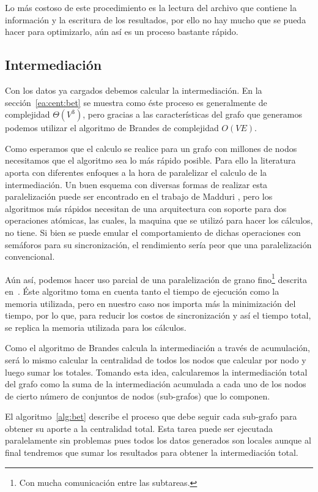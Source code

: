 

Lo más costoso de este procedimiento es la lectura del archivo que contiene la
información y la escritura de los resultados, por ello no hay mucho que se pueda
hacer para optimizarlo, aún así es un proceso bastante rápido.

\subsection{Intermediación}
Con los datos ya cargados debemos calcular la intermediación. En la
sección~\ref{ea:cent:bet} se muestra como éste proceso es generalmente de
complejidad $\Theta (V^3)$, pero gracias a las
características del grafo que generamos podemos utilizar el algoritmo de
Brandes\cite{brandes2001faster} de complejidad $O(VE)$.

Como esperamos que el calculo se realice para un grafo con millones de nodos
necesitamos que el algoritmo sea lo más rápido posible. Para ello la literatura
aporta con diferentes enfoques a la hora de paralelizar el calculo de la
intermediación. Un buen esquema con diversas formas de realizar esta
paralelización puede ser encontrado en el trabajo de Madduri
\etal\cite{madduri2009faster}, pero los algoritmos más rápidos necesitan de una
arquitectura con soporte para dos operaciones atómicas, las cuales, la maquina
que se utilizó para hacer los cálculos, no tiene. Si bien se puede emular el
comportamiento de dichas operaciones con semáforos para su sincronización, el
rendimiento sería peor que una paralelización convencional.

Aún así, podemos hacer uso parcial de una paralelización de grano
fino\footnote{Con mucha comunicación entre las subtareas.} descrita
en~\cite{bader2006parallel}. Éste algoritmo toma en cuenta tanto el tiempo de
ejecución como la memoria utilizada, pero en nuestro caso nos importa más la
minimización del tiempo, por lo que, para reducir los costos de sincronización y
así el tiempo total, se replica la memoria utilizada para los cálculos.

Como el algoritmo de Brandes calcula la intermediación a través de acumulación,
será lo mismo calcular la centralidad de todos los nodos que calcular por nodo y
luego sumar los totales. Tomando esta idea, calcularemos la intermediación total
del grafo como la suma de la intermediación acumulada a cada uno de los nodos de
cierto número de conjuntos de nodos (sub-grafos) que lo componen.

El algoritmo~\ref{alg:bet} describe el proceso que debe seguir cada sub-grafo
para obtener su aporte a la centralidad total. Esta tarea puede ser ejecutada
paralelamente sin problemas pues todos los datos generados son locales aunque
al final tendremos que sumar los resultados para obtener la intermediación
total.

